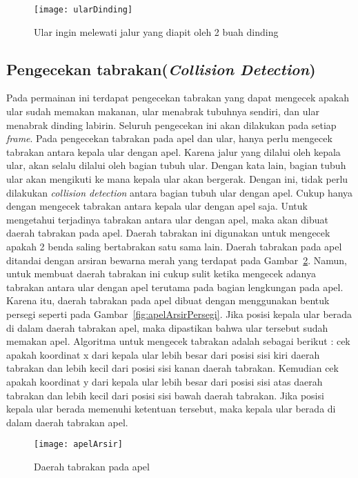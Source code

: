 \begin{figure}[H]
	\centering  
	\texttt{[image: ularDinding]}  
	\caption[Ular ingin melewati jalur yang diapit oleh 2 buah dinding]{Ular ingin melewati jalur yang diapit oleh 2 buah dinding}
	\label{fig:ularDinding} 
\end{figure}

\subsection{Pengecekan tabrakan(\textit{Collision Detection})}
Pada permainan ini terdapat pengecekan tabrakan yang dapat mengecek apakah ular sudah memakan makanan, ular menabrak tubuhnya sendiri, dan ular menabrak dinding labirin. Seluruh pengecekan ini akan dilakukan pada setiap \textit{frame}. Pada pengecekan tabrakan pada apel dan ular, hanya perlu mengecek tabrakan antara kepala ular dengan apel. Karena jalur yang dilalui oleh kepala ular, akan selalu dilalui oleh bagian tubuh ular. Dengan kata lain, bagian tubuh ular akan mengikuti ke mana kepala ular akan bergerak. Dengan ini, tidak perlu dilakukan \textit{collision detection} antara bagian tubuh ular dengan apel. Cukup hanya dengan mengecek tabrakan antara kepala ular dengan apel saja. Untuk mengetahui terjadinya tabrakan antara ular dengan apel, maka akan dibuat daerah tabrakan pada apel. Daerah tabrakan ini digunakan untuk mengecek apakah 2 benda saling bertabrakan satu sama lain. Daerah tabrakan pada apel ditandai dengan arsiran bewarna merah yang terdapat pada Gambar~\ref{fig:apelArsir}. Namun, untuk membuat daerah tabrakan ini cukup sulit ketika mengecek adanya tabrakan antara ular dengan apel terutama pada bagian lengkungan pada apel. Karena itu, daerah tabrakan pada apel dibuat dengan menggunakan bentuk persegi seperti pada Gambar~\ref{fig:apelArsirPersegi}. Jika posisi kepala ular berada di dalam daerah tabrakan apel, maka dipastikan bahwa ular tersebut sudah memakan apel. Algoritma untuk mengecek tabrakan adalah sebagai berikut : cek apakah koordinat x dari kepala ular lebih besar dari posisi sisi kiri daerah tabrakan dan lebih kecil dari posisi sisi kanan daerah tabrakan. Kemudian cek apakah koordinat y dari kepala ular lebih besar dari posisi sisi atas daerah tabrakan dan lebih kecil dari posisi sisi bawah daerah tabrakan. Jika posisi kepala ular berada memenuhi ketentuan tersebut, maka kepala ular berada di dalam daerah tabrakan apel.\\

\begin{figure}[H]
	\centering  
	\texttt{[image: apelArsir]}  
	\caption[Daerah tabrakan pada apel]{Daerah tabrakan pada apel}
	\label{fig:apelArsir} 
\end{figure}

